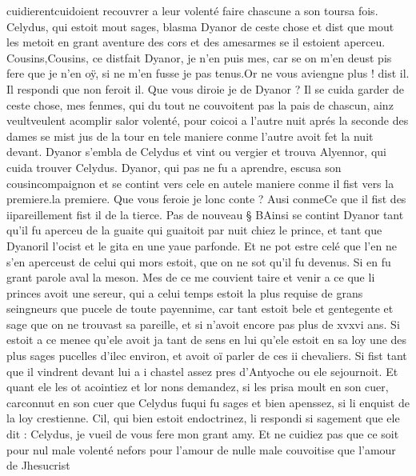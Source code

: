 \documentclass{article}
\begin{document}
\begin{pages}
   cuidierentcuidoient recouvrer a leur volenté faire chascune 
   a son toursa fois. \pend
\pstart Celydus, qui estoit mout sages, 
   blasma Dyanor de ceste chose et dist que mout les metoit en grant 
      aventure des cors et des amesarmes se il estoient aperceu.
   Cousins,Cousins, ce 
      distfait Dyanor, je n’en puis mes, 
      car se on m’en deust pis fere que je n’en oÿ, si ne m’en fusse je pas tenus.Or ne vous aviengne plus ! dist il.
   Il respondi que non feroit il. Que vous diroie je de 
   Dyanor ? Il se cuida garder de ceste chose, mes fenmes, qui du tout ne couvoitent pas 
   la pais de chascun, ainz veultveulent acomplir 
   salor volenté, pour 
   coicoi a l’autre nuit aprés 
   la seconde des dames se mist jus de la tour 
   en tele maniere conme l’autre avoit fet la nuit devant. 
   Dyanor s'embla de Celydus et vint ou 
   vergier et trouva Alyennor, 
   qui cuida trouver Celydus. Dyanor, qui pas ne fu a aprendre, 
   escusa son cousincompaignon et se 
   contint vers cele en autele maniere conme il fist vers 
   la premiere.la premiere. Que vous feroie je lonc 
      conte ? 
   Ausi conmeCe que 
   il fist des iipareillement fist il de la tierce. \pend 
\pstart Pas de nouveau § BAinsi se contint 
   Dyanor tant qu’il fu aperceu de 
   la guaite qui guaitoit par nuit chiez le prince, 
   et tant que Dyanoril 
   l’ocist et le gita en une yaue parfonde. Et ne pot estre celé que l’en ne 
   s’en aperceust de celui qui mors estoit, 
   que on ne sot qu’il fu devenus. Si en fu grant parole aval la meson. Mes de ce me couvient taire et venir a ce que 
   li princes avoit une sereur, 
   qui a celui temps estoit la plus requise de grans seingneurs que pucele de toute payennime, 
   car tant estoit bele et gentegente et sage que on ne trouvast sa pareille, 
   et si n’avoit encore pas plus de xvxvi ans. 
   Si estoit a ce menee qu’ele avoit ja tant de sens en lui qu’ele estoit en sa loy 
   une des plus sages pucelles d’ilec environ, 
   et avoit oï parler de ces ii chevaliers. Si fist tant que il vindrent devant lui a i chastel 
   assez pres d’Antyoche ou ele sejournoit. Et quant ele les ot acointiez et lor nons demandez, 
   si les prisa moult en son cuer, carconnut en son cuer que 
   Celydus fuqui fu sages 
   et bien apenssez, si li enquist de la loy crestienne. Cil, qui bien estoit 
   endoctrinez, li respondi si sagement que ele dit :
   Celydus, je vueil de vous fere mon 
      grant amy. Et ne cuidiez 
      pas que ce soit pour 
      nul male volenté 
         nefors pour 
      l’amour de 
      nulle male couvoitise que l’amour de Jhesucrist 

\end{pages}
\end{document}

